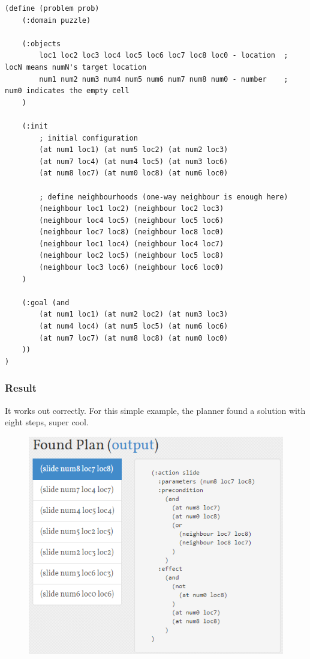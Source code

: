 ﻿\documentclass[a4paper, 11pt]{article}
\begin{document}
\begin{lstlisting}[title=problem\_puzzle.pddl]
(define (problem prob)
    (:domain puzzle)
    
    (:objects
        loc1 loc2 loc3 loc4 loc5 loc6 loc7 loc8 loc0 - location  ; locN means numN's target location
        num1 num2 num3 num4 num5 num6 num7 num8 num0 - number    ; num0 indicates the empty cell
    )

    (:init
        ; initial configuration
        (at num1 loc1) (at num5 loc2) (at num2 loc3)
        (at num7 loc4) (at num4 loc5) (at num3 loc6)
        (at num8 loc7) (at num0 loc8) (at num6 loc0)

        ; define neighbourhoods (one-way neighbour is enough here)
        (neighbour loc1 loc2) (neighbour loc2 loc3)
        (neighbour loc4 loc5) (neighbour loc5 loc6)
        (neighbour loc7 loc8) (neighbour loc8 loc0)
        (neighbour loc1 loc4) (neighbour loc4 loc7)
        (neighbour loc2 loc5) (neighbour loc5 loc8)
        (neighbour loc3 loc6) (neighbour loc6 loc0)
    )

    (:goal (and
        (at num1 loc1) (at num2 loc2) (at num3 loc3)
        (at num4 loc4) (at num5 loc5) (at num6 loc6)
        (at num7 loc7) (at num8 loc8) (at num0 loc0)
    ))
)
\end{lstlisting}
\subsubsection{Result}
It works out correctly. For this simple example, the planner found a solution with eight steps, super cool.

\begin{figure}[h]
  \centering
  \includegraphics[width=13cm]{Pic/puzzlepddlresult.png}
\end{figure}
\end{document}
